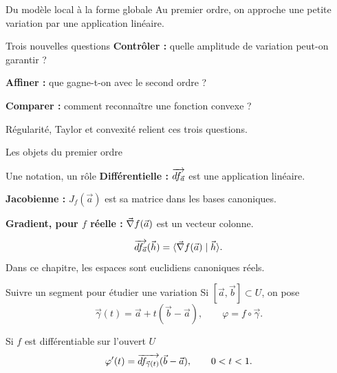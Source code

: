 \begin{frame}[t]{Du modèle local à la forme globale}
\coursanalyse
Au premier ordre, on approche une petite variation par une application linéaire.
\begin{cours}{Trois nouvelles questions}
\textbf{Contrôler :} quelle amplitude de variation peut-on garantir ?

\medskip
\textbf{Affiner :} que gagne-t-on avec le second ordre ?

\medskip
\textbf{Comparer :} comment reconnaître une fonction convexe ?
\end{cours}
\vfill Régularité, Taylor et convexité relient ces trois questions.
\end{frame}

\begin{frame}[t]{Les objets du premier ordre}
\coursanalyse
\begin{cours}{Une notation, un rôle}
\textbf{Différentielle :} $\overrightarrow{df_{\vec a}}$ est une application linéaire.

\medskip
\textbf{Jacobienne :} $J_f(\vec a)$ est sa matrice dans les bases canoniques.

\medskip
\textbf{Gradient, pour $f$ réelle :} $\vec\nabla f(\vec a)$ est un vecteur colonne.
\end{cours}
\[\overrightarrow{df_{\vec a}}(\vec h)=\langle \vec\nabla f(\vec a)\mid \vec h\rangle.\]
\vfill Dans ce chapitre, les espaces sont euclidiens canoniques réels.
\end{frame}

\begin{frame}[t]{Suivre un segment pour étudier une variation}
\coursanalyse
Si $[\vec a,\vec b]\subset U$, on pose
\[\vec\gamma(t)=\vec a+t(\vec b-\vec a),\qquad\varphi=f\circ\vec\gamma.\]
\begin{theoreme}{Si $f$ est différentiable sur l'ouvert $U$}
\[\varphi'(t)=\overrightarrow{df_{\vec\gamma(t)}}(\vec b-\vec a),\qquad 0<t<1.\]
\end{theoreme}
\begin{center}\end{center}
\end{frame}

